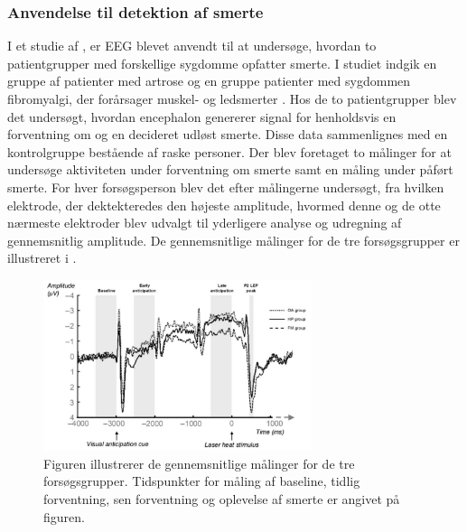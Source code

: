 \subsubsection{Anvendelse til detektion af smerte}
I et studie af \citep{Brown2013}, er EEG blevet anvendt til at undersøge, hvordan to patientgrupper med forskellige sygdomme opfatter smerte. I studiet indgik en gruppe af patienter med artrose og en gruppe patienter med sygdommen fibromyalgi, der forårsager muskel- og ledsmerter \citep{Brown2013}\citep{9}. Hos de to patientgrupper blev det undersøgt, hvordan encephalon genererer signal for henholdsvis en forventning om og en decideret udløst smerte. Disse data sammenlignes med en kontrolgruppe bestående af raske personer. Der blev foretaget to målinger for at undersøge aktiviteten under forventning om smerte samt en måling under påført smerte. For hver forsøgsperson blev det efter målingerne undersøgt, fra hvilken elektrode, der dektekteredes den højeste amplitude, hvormed denne og de otte nærmeste elektroder blev udvalgt til yderligere analyse og udregning af gennemsnitlig amplitude. De gennemsnitlige målinger for de tre forsøgsgrupper er illustreret i .
\begin{figure}[H] 
	\begin{center}
		\includegraphics[width=0.7\textwidth]{figures/bProblemanalyse/EEG_ERP}
	\end{center}
	\caption{Figuren illustrerer de gennemsnitlige målinger for de tre forsøgsgrupper. Tidspunkter for måling af baseline, tidlig forventning, sen forventning og oplevelse af smerte er angivet på figuren. \citep{Brown2013}} 
	\label{fig:EEG_gns} 
\end{figure} 

